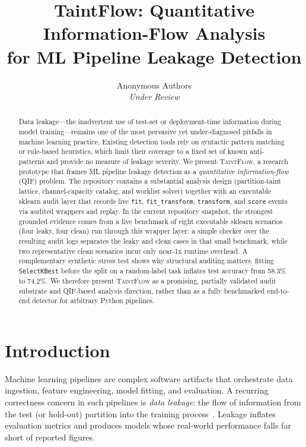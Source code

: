 \documentclass[11pt]{article}
\title{\textbf{TaintFlow: Quantitative Information-Flow Analysis\\for ML Pipeline Leakage Detection}}
\author{%
  Anonymous Authors\\
  \textit{Under Review}
}
\date{}
\begin{document}
\maketitle

\begin{abstract}
Data leakage---the inadvertent use of test-set or deployment-time
information during model training---remains one of the most pervasive
yet under-diagnosed pitfalls in machine learning practice.
Existing detection tools rely on syntactic pattern matching or
rule-based heuristics, which limit their coverage to a fixed set of
known anti-patterns and provide no measure of leakage severity.
We present \textsc{TaintFlow}, a research prototype that frames ML
pipeline leakage detection as a \emph{quantitative information-flow}
(QIF) problem.  The repository contains a substantial analysis design
(partition-taint lattice, channel-capacity catalog, and worklist
solver) together with an executable sklearn audit layer that records
live \texttt{fit}, \texttt{fit\_transform}, \texttt{transform}, and
\texttt{score} events via audited wrappers and replay.  In the current
repository snapshot, the strongest grounded evidence comes from a live
benchmark of eight executable sklearn scenarios (four leaky, four
clean) run through this wrapper layer: a simple checker over the
resulting audit logs separates the leaky and clean cases in that small
benchmark, while two representative clean scenarios incur only
near-1x runtime overhead.  A complementary synthetic stress test shows
why structural auditing matters: fitting \texttt{SelectKBest} before
the split on a random-label task inflates test accuracy from 58.3\% to
74.2\%.  We therefore present \textsc{TaintFlow} as a promising,
partially validated audit substrate and QIF-based analysis direction,
rather than as a fully benchmarked end-to-end detector for arbitrary
Python pipelines.
\end{abstract}

\section{Introduction}\label{sec:intro}

Machine learning pipelines are complex software artifacts that
orchestrate data ingestion, feature engineering, model fitting, and
evaluation.  A recurring correctness concern in such pipelines is
\emph{data leakage}: the flow of information from the test (or
hold-out) partition into the training process~\cite{kaufman2012}.
Leakage inflates evaluation metrics and produces models whose
real-world performance falls far short of reported figures.
\end{document}
